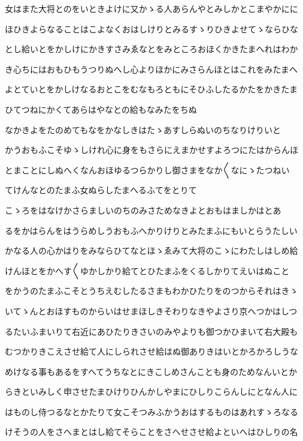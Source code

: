 \documentclass[a4paper,11pt,landscape]{ltjtarticle}
\begin{document}
女はまた大将とのをいときよけに又かゝる人あらんやとみしかとこまやかにに
\par\medskip
ほひきよらなることはこよなくおはしけりとみるすゝりひきよせてゝならひな
\par\medskip
とし給いとをかしけにかきすさみゑなとをみところおほくかきたまへれはわか
\par\medskip
き心ちにはおもひもうつりぬへし心よりほかにみさらんほとはこれをみたまへ
\par\medskip
よとていとをかしけなるおとこをむなもろともにそひふしたるかたをかきたま
\par\medskip
ひてつねにかくてあらはやなとの給もなみたをちぬ
\par\medskip
なかきよをたのめてもなをかなしきはたゝあすしらぬいのちなりけりいと
\par\medskip
かうおもふこそゆゝしけれ心に身をもさらにえまかせすよろつにたはからんほ
\par\medskip
とまことにしぬへくなんおほゆるつらかりし御さまをなか〱なにゝたつねい
\par\medskip
てけんなとのたまふ女ぬらしたまへるふてをとりて
\par\medskip
こゝろをはなけかさらましいのちのみさためなきよとおもはましかはとあ
\par\medskip
るをかはらんをはうらめしうおもふへかりけりとみたまふにもいとらうたしい
\par\medskip
かなる人の心かはりをみならひてなとほゝゑみて大将のこゝにわたしはしめ給
\par\medskip
けんほとをかへす〱ゆかしかり給てとひたまふをくるしかりてえいはぬこと
\par\medskip
をかうのたまふこそとうちえむしたるさまもわかひたりをのつからそれはきゝ
\par\medskip
いてゝんとおほすものからいはせまほしきそわりなきやよさり京へつかはしつ
\par\medskip
るたいふまいりて右近にあひたりきさいのみやよりも御つかひまいて右大殿も
\par\medskip
むつかりきこえさせ給て人にしられさせ給はぬ御ありきはいとかろかろしうな
\par\medskip
めけなる事もあるをすへてうちなとにきこしめさんことも身のためなんいとか
\par\medskip
らきといみしく申させたまひけりひんかしやまにひしりこらんしにとなん人に
\par\medskip
はものし侍つるなとかたりて女こそつみふかうおはするものはあれすゝろなる
\par\medskip
けそうの人をさへまとはし給てそらことをさへせさせ給よといへはひしりの名
\end{document}
